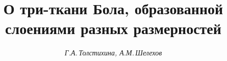 






\newcommand{\crazy}[2]{\displaystyle{\mathop{#1}_{#2}}}


\newcommand{\const}{\operatorname{const}}


\newcommand{\tts}[1]{}







\setcounter{page}{56}















\author{\it Г.А.\,Толстихина, А.М.\,Шелехов}




\title{О три-ткани Бола, образованной слоениями разных размерностей}





\date{}




\pagestyle{plain} %







\maketitle


\label{begin}











